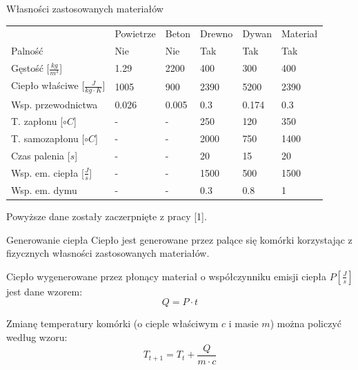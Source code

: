 \documentclass{beamer}
\begin{document}
\begin{frame}{Własności zastosowanych materiałów}
    \begin{table}[]
        \footnotesize
        \begin{tabular}{llllll}
        & Powietrze & Beton & Drewno & Dywan & Materiał \\
        Palność & Nie & Nie & Tak & Tak & Tak \\
        Gęstość [\(\frac{kg}{m^3}\)] & 1.29 & 2200 & 400 & 300 & 400 \\
        Ciepło właściwe [\(\frac{J}{kg \cdot K}\)] & 1005 & 900 & 2390 & 5200 & 2390 \\
        Wsp. przewodnictwa & 0.026 & 0.005 & 0.3 & 0.174 & 0.3 \\
        T. zapłonu [\(\circ C\)] & - & - & 250 & 120 & 350\\
        T. samozapłonu [\(\circ C\)] & - & - & 2000 & 750 & 1400 \\
        Czas palenia [\(s\)] & - & - & 20 & 15 & 20 \\
        Wsp. em. ciepła [\(\frac{J}{s}\)] & - & - & 1500 & 500 & 1500 \\
        Wsp. em. dymu & - & - & 0.3 & 0.8 & 1 \\
        \end{tabular}
    \end{table}

    Powyższe dane zostały zaczerpnięte z pracy [1].
\end{frame}

\begin{frame}{Generowanie ciepła}
    Ciepło jest generowane przez palące się komórki korzystając z fizycznych własności zastosowanych materiałów.
    \newline

    Ciepło wygenerowane przez płonący materiał o współczynniku emisji ciepła \(P \left[\frac{J}{s}\right]\) jest dane wzorem:
    \begin{equation}
        Q = P \cdot t
    \end{equation}

    Zmianę temperatury komórki (o cieple właściwym \(c\) i masie \(m\)) można policzyć według wzoru:
    \begin{equation}
        T_{t+1} = T_t + \frac{Q}{m \cdot c}
    \end{equation}
\end{frame}
\end{document}
